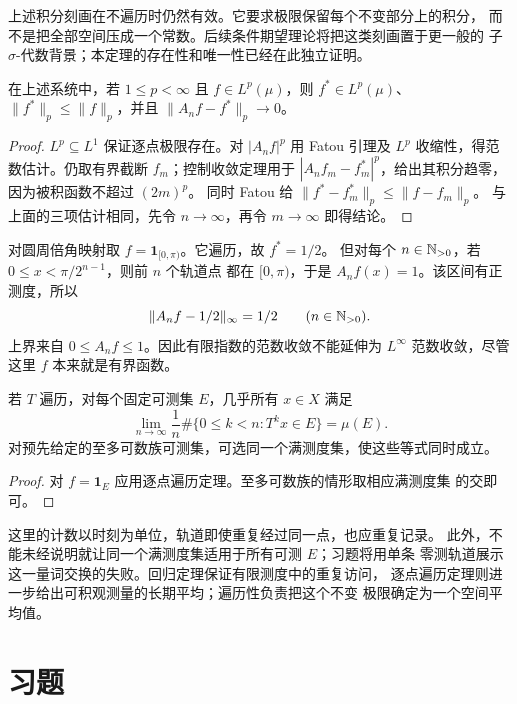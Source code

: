 上述积分刻画在不遍历时仍然有效。它要求极限保留每个不变部分上的积分，
而不是把全部空间压成一个常数。后续条件期望理论将把这类刻画置于更一般的
子 $\sigma$-代数背景；本定理的存在性和唯一性已经在此独立证明。

\begin{corollary}\label{cor:ergodic-lp-convergence}
在上述系统中，若 $1\le p<\infty$ 且 $f\in L^p(\mu)$，则
$f^*\in L^p(\mu)$、$\|f^*\|_p\le\|f\|_p$，并且
$\|A_nf-f^*\|_p\to0$。
\end{corollary}
\begin{proof}
$L^p\subseteq L^1$ 保证逐点极限存在。对 $|A_nf|^p$ 用 Fatou 引理及
$L^p$ 收缩性，得范数估计。仍取有界截断 $f_m$；控制收敛定理用于
$|A_nf_m-f_m^*|^p$，给出其积分趋零，因为被积函数不超过 $(2m)^p$。
同时 Fatou 给 $\|f^*-f_m^*\|_p\le\|f-f_m\|_p$。
与上面的三项估计相同，先令 $n\to\infty$，再令 $m\to\infty$ 即得结论。
\end{proof}

\begin{counterexample}[本质一致收敛的失败]\label{ex:ergodic-no-linfty-convergence}
对圆周倍角映射取 $f=\mathbf1_{[0,\pi)}$。它遍历，故 $f^*=1/2$。
但对每个 $n\in\mathbb{N}_{>0}$，若 $0\le x<\pi/2^{n-1}$，则前 $n$ 个轨道点
都在 $[0,\pi)$，于是 $A_nf(x)=1$。该区间有正测度，所以
\[
 \|A_nf-1/2\|_\infty=1/2\qquad(n\in\mathbb{N}_{>0}).
\]
上界来自 $0\le A_nf\le1$。因此有限指数的范数收敛不能延伸为
$L^\infty$ 范数收敛，尽管这里 $f$ 本来就是有界函数。
\end{counterexample}

\begin{corollary}[访问频率]\label{cor:ergodic-visiting-frequency}
若 $T$ 遍历，对每个固定可测集 $E$，几乎所有 $x\in X$ 满足
\[
 \lim_{n\to\infty}\frac1n
 \#\{0\le k<n:T^kx\in E\}=\mu(E).
\]
对预先给定的至多可数族可测集，可选同一个满测度集，使这些等式同时成立。
\end{corollary}
\begin{proof}
对 $f=\mathbf1_E$ 应用逐点遍历定理。至多可数族的情形取相应满测度集
的交即可。
\end{proof}

这里的计数以时刻为单位，轨道即使重复经过同一点，也应重复记录。
此外，不能未经说明就让同一个满测度集适用于所有可测 $E$；习题将用单条
零测轨道展示这一量词交换的失败。回归定理保证有限测度中的重复访问，
逐点遍历定理则进一步给出可积观测量的长期平均；遍历性负责把这个不变
极限确定为一个空间平均值。

\section*{习题}
